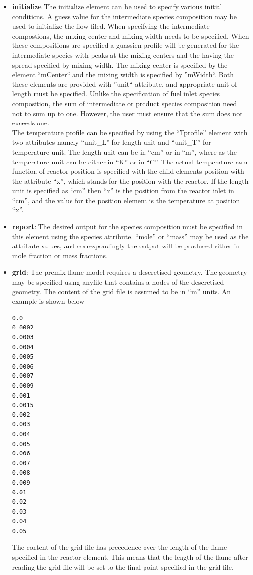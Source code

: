 \begin{itemize}
\item \textbf{initialize} The initialize element can be used to specify various initial conditions. 
A guess value for the intermediate species composition may be used to initialize the flow filed. When specifying the intermediate compostions, the mixing center and mixing width needs to be specified. When these compositions are specified a guassien profile will be generated for the intermediate species with peaks at the mixing centers and the having the spread specified by mixing width. The mixing center is specified by the element ``mCenter`` and the mixing width is specified by ''mWidth``. Both these elements are provided with ''unit`` attribute, and appropriate unit of length must be specified. Unlike the specification of fuel inlet species composition, the sum of intermediate or product species composition need not to sum up to one. However, the user must ensure that the sum does not exceeds one.\\

The temperature profile can be specified by using the ``Tprofile'' element with two attributes namely ``unit\_L'' for length unit and ``unit\_T'' for temperature unit. The length unit can be in ``cm'' or in ``m'', where as the temperature unit can be either in ``K'' or in ``C''. The actual temperature as a function of reactor position is specified with the child elements position with the attribute ``x'', which stands for the position with the reactor. If the length unit is specified as ``cm'' then ``x'' is the position from the reactor inlet in ``cm'', and the value for the position element is the temperature at position ``x''.

\item \textbf{report}: The desired output for the species composition must be specified in this element using the species attribute. ``mole'' or ``mass'' may be used as the attribute values, and correspondingly the output will be produced either in mole fraction or mass fractions.

\item \textbf{grid}: The premix flame model requires a descretised geometry. The geometry may be specified using anyfile that contains a nodes of the descretised geometry. The content of the grid file is assumed to be in ``m'' units. An example is shown below\\
{\scriptsize{\begin{verbatim}
0.0
0.0002
0.0003
0.0004
0.0005
0.0006
0.0007
0.0009
0.001
0.0015
0.002
0.003
0.004
0.005
0.006
0.007
0.008
0.009
0.01
0.02
0.03
0.04
0.05
\end{verbatim}
}}

The content of the grid file has precedence over the length of the flame specified in the reactor element. This means that the length of the flame after reading the grid file will be set to the final point specified in the grid file.
\end{itemize}

